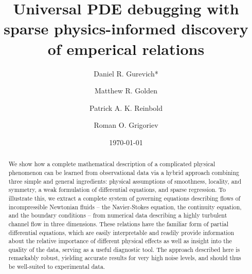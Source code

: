 \documentclass[
 reprint,
 amsmath,amssymb,
 aps,
]{revtex4-2}
\begin{document}
\title{Universal PDE debugging with sparse physics-informed discovery of emperical relations}
\author{Daniel R. Gurevich*}
\author{Matthew R. Golden}
\author{Patrick A. K. Reinbold}
\author{Roman O. Grigoriev}
\date{\today}

\begin{abstract}
We show how a complete mathematical description of a complicated physical phenomenon can be learned from observational data via a hybrid approach combining three simple and general ingredients: physical assumptions of smoothness, locality, and symmetry, a weak formulation of differential equations, and sparse regression. To illustrate this, we extract a complete system of governing equations describing flows of incompressible Newtonian fluids -- the Navier-Stokes equation, the continuity equation, and the boundary conditions -- from numerical data describing a highly turbulent channel flow in three dimensions. These relations have the familiar form of partial differential equations, which are easily interpretable and readily provide information about the relative importance of different physical effects as well as insight into the quality of the data, serving as a useful diagnostic tool. The approach described here is remarkably robust, yielding accurate results for very high noise levels, and should thus be well-suited to experimental data.
\end{abstract}
\end{document}
